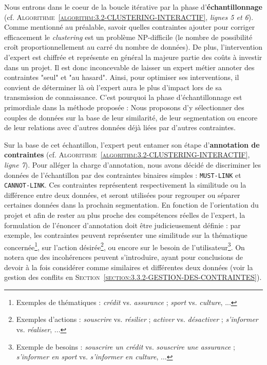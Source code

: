 		Nous entrons dans le coeur de la boucle itérative par la phase d'\textbf{échantillonnage} (cf. \textsc{Algorithme~\ref{algorithm:3.2-CLUSTERING-INTERACTIF}}, \textit{lignes 5 et 6}).
		Comme mentionné au préalable, savoir quelles contraintes ajouter pour corriger efficacement le \textit{clustering} est un problème NP-difficile (le nombre de possibilité croît proportionnellement au carré du nombre de données).
		De plus, l'intervention d'expert est chiffrée et représente en général la majeure partie des coûts à investir dans un projet.
		Il est donc inconcevable de laisser un expert métier annoter des contraintes "seul" et "au hasard".
		Ainsi, pour optimiser ses interventions, il convient de déterminer là où l'expert aura le plus d'impact lors de sa transmission de connaissance.
		C'est pourquoi la phase d'échantillonnage est primordiale dans la méthode proposée : Nous proposons d'y sélectionner des couples de données sur la base de leur similarité, de leur segmentation ou encore de leur relations avec d'autres données déjà liées par d'autres contraintes.
		
		Sur la base de cet échantillon, l'expert peut entamer son étape d'\textbf{annotation de contraintes} (cf. \textsc{Algorithme~\ref{algorithm:3.2-CLUSTERING-INTERACTIF}}, \textit{ligne 7}).
		Pour alléger la charge d'annotation, nous avons décidé de discriminer les données de l'échantillon par des contraintes binaires simples : \texttt{MUST-LINK} et \texttt{CANNOT-LINK}. Ces contraintes représentent respectivement la similitude ou la différence entre deux données, et seront utilisées pour regrouper ou séparer certaines données dans la prochain segmentation.
		En fonction de l'orientation du projet et afin de rester au plus proche des compétences réelles de l'expert, la formulation de l'énoncer d'annotation doit être judicieusement définie : par exemple, les contraintes peuvent représenter une similitude
		sur la thématique concernée\footnote{Exemples de thématiques : \textit{crédit} vs. \textit{assurance} ; \textit{sport} vs. \textit{culture}, ...},
		sur l'action désirée\footnote{Exemples d'actions : \textit{souscrire} vs. \textit{résilier} ; \textit{activer} vs. \textit{désactiver} ; \textit{s'informer} vs. \textit{réaliser}, ...},
		ou encore sur le besoin de l'utilisateur\footnote{Exemple de besoins : \textit{souscrire un crédit} vs. \textit{souscrire une assurance} ; \textit{s'informer en sport} vs. \textit{s'informer en culture}, ...}.
		On notera que des incohérences peuvent s'introduire, ayant pour conclusions de devoir à la fois considérer comme similaires et différentes deux données (voir la gestion des conflits en \textsc{Section~\ref{section:3.3.2-GESTION-DES-CONTRAINTES}}).
		
